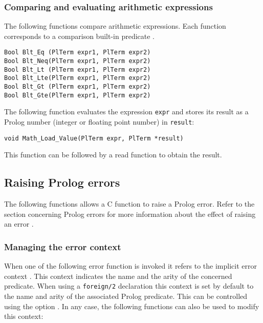 \subsubsection{Comparing and evaluating arithmetic expressions}
The following functions compare arithmetic expressions. Each function
corresponds to a comparison built-in predicate .

\begin{Indentation}
\begin{verbatim}
Bool Blt_Eq (PlTerm expr1, PlTerm expr2)
Bool Blt_Neq(PlTerm expr1, PlTerm expr2)
Bool Blt_Lt (PlTerm expr1, PlTerm expr2)
Bool Blt_Lte(PlTerm expr1, PlTerm expr2)
Bool Blt_Gt (PlTerm expr1, PlTerm expr2)
Bool Blt_Gte(PlTerm expr1, PlTerm expr2)
\end{verbatim}
\end{Indentation}

The following function evaluates the expression \texttt{expr} and stores its
result as a Prolog number (integer or floating point number) in
\texttt{result}:

\begin{Indentation}
\begin{verbatim}
void Math_Load_Value(PlTerm expr, PlTerm *result)
\end{verbatim}
\end{Indentation}

This function can be followed by a read function  to obtain the result.

\subsection{Raising Prolog errors}
\label{Raising-Prolog-errors}
The following functions allows a C function to raise a Prolog error. Refer
to the section concerning Prolog errors for more information about the
effect of raising an error .

\subsubsection{Managing the error context}
When one of the following error function is invoked it refers to the
implicit error context . This
context indicates the name and the arity of the concerned predicate. When
using a \texttt{foreign/2} declaration this context is set by default to the
name and arity of the associated Prolog predicate. This can be controlled
using the  option . In any
case, the following functions can also be used to modify this context:


